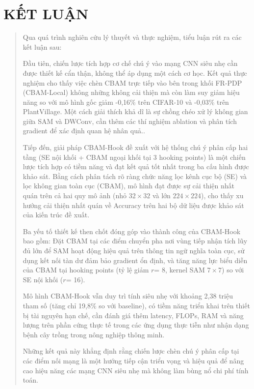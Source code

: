 \documentclass[
  12pt,
  a4paper,
]{report}
\begin{document}
\section{KẾT LUẬN}\label{kux1ebft-luux1eadn}

\begin{quote}
Qua quá trình nghiên cứu lý thuyết và thực nghiệm, tiểu luận rút ra các
kết luận sau:

Đầu tiên, chiến lược tích hợp cơ chế chú ý vào mạng CNN siêu nhẹ cần
được thiết kế cẩn thận, không thể áp dụng một cách cơ học. Kết quả thực
nghiệm cho thấy việc chèn CBAM trực tiếp vào bên trong khối FR-PDP
(CBAM-Local) không những không cải thiện mà còn làm suy giảm hiệu năng
so với mô hình gốc giảm -0,16\% trên CIFAR-10 và -0,03\% trên
PlantVillage. Một cách giải thích khả dĩ là sự chồng chéo xử lý không
gian giữa SAM và DWConv, cần thêm các thí nghiệm ablation và phân tích
gradient để xác định quan hệ nhân quả..

Tiếp đến, giải pháp CBAM-Hook đề xuất với hệ thống chú ý phân cấp hai
tầng (SE nội khối + CBAM ngoại khối tại 3 hooking points) là một chiến
lược tích hợp có tiềm năng và đạt kết quả tốt nhất trong ba cấu hình
được khảo sát. Bằng cách phân tách rõ ràng chức năng lọc kênh cục bộ
(SE) và lọc không gian toàn cục (CBAM), mô hình đạt được sự cải thiện
nhất quán trên cả hai quy mô ảnh (nhỏ \(32 \times 32\) và lớn
\(224 \times 224\)), cho thấy xu hướng cải thiện nhất quán về Accuracy
trên hai bộ dữ liệu được khảo sát của kiến trúc đề xuất.

Ba yếu tố thiết kế then chốt đóng góp vào thành công của CBAM-Hook bao
gồm: Đặt CBAM tại các điểm chuyển pha nơi vùng tiếp nhận tích lũy đủ lớn
để SAM hoạt động hiệu quả trên thông tin ngữ nghĩa toàn cục, sử dụng kết
nối tàn dư đảm bảo gradient ổn định, và tăng năng lực biểu diễn của CBAM
tại hooking points (tỷ lệ giảm \(r\)= 8, kernel SAM \(7 \times 7\)) so
với SE nội khối (\(r\)= 16).

Mô hình CBAM-Hook vẫn duy trì tính siêu nhẹ với khoảng 2,38 triệu tham
số (tăng chỉ 19,8\% so với baseline), có tiềm năng triển khai trên thiết
bị tài nguyên hạn chế, cần đánh giá thêm latency, FLOPs, RAM và năng
lượng trên phần cứng thực tế trong các ứng dụng thực tiễn như nhận dạng
bệnh cây trồng trong nông nghiệp thông minh.

Những kết quả này khẳng định rằng chiến lược chèn chú ý phân cấp tại các
điểm nối mạng là một hướng tiếp cận triển vọng và hiệu quả để nâng cao
hiệu năng các mạng CNN siêu nhẹ mà không làm bùng nổ chi phí tính toán.
\end{quote}
\end{document}
